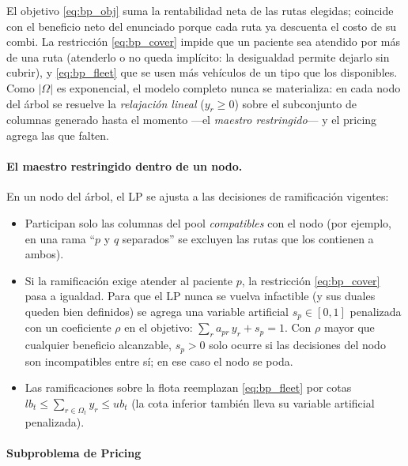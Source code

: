 \documentclass[12pt]{article}
\numberwithin{algorithm}{section}
\begin{document}
El objetivo \eqref{eq:bp_obj} suma la rentabilidad neta de las rutas elegidas; coincide con el beneficio neto del enunciado porque cada ruta ya descuenta el costo de su combi. La restricción \eqref{eq:bp_cover} impide que un paciente sea atendido por más de una ruta (atenderlo o no queda implícito: la desigualdad permite dejarlo sin cubrir), y \eqref{eq:bp_fleet} que se usen más vehículos de un tipo que los disponibles. Como $|\Omega|$ es exponencial, el modelo completo nunca se materializa: en cada nodo del árbol se resuelve la \emph{relajación lineal} ($y_r \geq 0$) sobre el subconjunto de columnas generado hasta el momento ---el \emph{maestro restringido}--- y el pricing agrega las que falten.

\paragraph{El maestro restringido dentro de un nodo.} En un nodo del árbol, el LP se ajusta a las decisiones de ramificación vigentes:
\begin{itemize}
    \item Participan solo las columnas del pool \emph{compatibles} con el nodo (por ejemplo, en una rama ``$p$ y $q$ separados'' se excluyen las rutas que los contienen a ambos).
    \item Si la ramificación exige atender al paciente $p$, la restricción \eqref{eq:bp_cover} pasa a igualdad. Para que el LP nunca se vuelva infactible (y sus duales queden bien definidos) se agrega una variable artificial $s_p \in [0,1]$ penalizada con un coeficiente $\rho$ en el objetivo: $\sum_r a_{pr}\, y_r + s_p = 1$. Con $\rho$ mayor que cualquier beneficio alcanzable, $s_p > 0$ solo ocurre si las decisiones del nodo son incompatibles entre sí; en ese caso el nodo se poda.
    \item Las ramificaciones sobre la flota reemplazan \eqref{eq:bp_fleet} por cotas $lb_t \leq \sum_{r \in \Omega_t} y_r \leq ub_t$ (la cota inferior también lleva su variable artificial penalizada).
\end{itemize}

\paragraph{Subproblema de Pricing}
\end{document}
